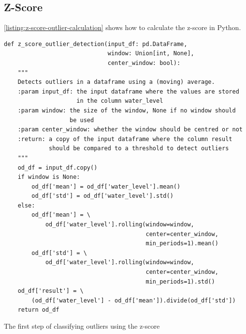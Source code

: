 \subsection{Z-Score}
\autoref{listing:z-score-outlier-calculation} shows how to calculate the z-score in Python.
\begin{listing}[htp]
\small
\begin{verbatim}
def z_score_outlier_detection(input_df: pd.DataFrame,
                              window: Union[int, None],
                              center_window: bool):
    """
    Detects outliers in a dataframe using a (moving) average.
    :param input_df: the input dataframe where the values are stored
                     in the column water_level
    :param window: the size of the window, None if no window should
                   be used
    :param center_window: whether the window should be centred or not
    :return: a copy of the input dataframe where the column result
             should be compared to a threshold to detect outliers
    """
    od_df = input_df.copy()
    if window is None:
        od_df['mean'] = od_df['water_level'].mean()
        od_df['std'] = od_df['water_level'].std()
    else:
        od_df['mean'] = \
            od_df['water_level'].rolling(window=window,
                                         center=center_window,
                                         min_periods=1).mean()
        od_df['std'] = \
            od_df['water_level'].rolling(window=window,
                                         center=center_window,
                                         min_periods=1).std()
    od_df['result'] = \
        (od_df['water_level'] - od_df['mean']).divide(od_df['std'])
    return od_df
\end{verbatim}
\caption{The first step of classifying outliers using the z-score}
\label{listing:z-score-outlier-calculation}
\end{listing}
\clearpage
